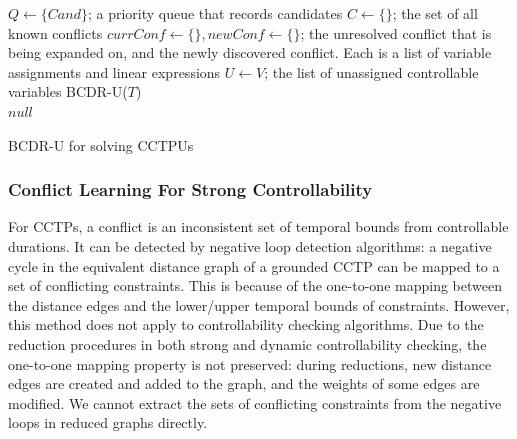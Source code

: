\documentclass[jair,twoside,11pt,theapa]{article}
\let\oldnl\nl%
\newcommand{\nonl}{\renewcommand{\nl}{\let\nl\oldnl}}%
\begin{document}
\begin{algorithm}[htb!]
	\SetAlgoLined
	\Indm
	\Initialize{}
	\;
	{$Q\leftarrow\{\mathit{Cand}\}$; a priority queue that records candidates}\;
	{$C\leftarrow\{\}$; the set of all known conflicts}\;
	{$\mathit{currConf}\leftarrow \{\}, \mathit{newConf}\leftarrow \{\}$; the unresolved conflict that is being expanded on, and the newly discovered conflict. Each is a list of variable assignments and linear expressions}\;
	{$U\leftarrow V$; the list of unassigned controllable variables}\;
	\Indm
	\Algorithm{}
	\nonl\textsc{BCDR-U}($\mathit{T}$)\\
	\Indp
\Return $null$\;
\caption{BCDR-U for solving CCTPUs}
\label{alg:bcdr_controllability}
\end{algorithm}


\subsubsection{Conflict Learning For Strong Controllability}


For CCTPs, a conflict is an inconsistent set of temporal bounds from controllable durations. It can
be detected by negative loop detection algorithms: a negative cycle in the
equivalent distance graph of a grounded CCTP can be mapped to a set of
conflicting constraints. This is because of the one-to-one mapping between the
distance edges and the lower/upper temporal bounds of constraints. However, this
method does not apply to controllability checking algorithms. Due to the
reduction procedures in both strong and dynamic controllability checking, the one-to-one mapping property is not preserved: during reductions,
new distance edges are created and added to the graph, and the weights of some
edges are modified. We cannot extract the sets of conflicting constraints from
the negative loops in reduced graphs directly.
\end{document}

